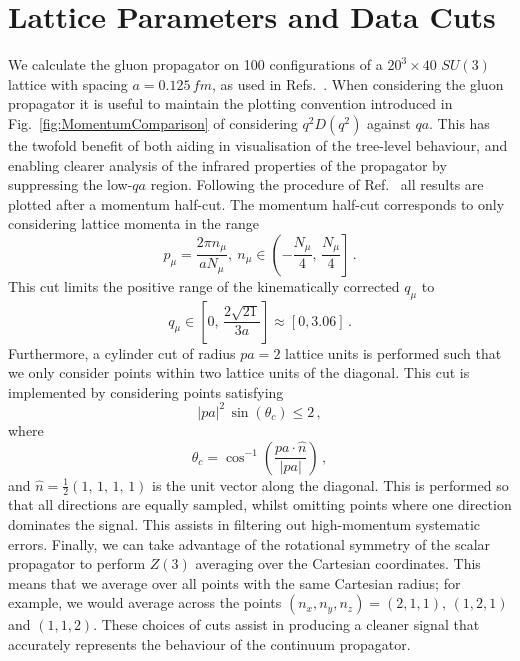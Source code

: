 \section{Lattice Parameters and Data Cuts} \label{sec:LatticeParameters}
We calculate the gluon propagator on 100 configurations of a $20^3\times 40$ $SU(3)$ lattice with spacing $a=0.125\,\si{fm}$, as used in Refs.~\cite{Trewartha:2015nna,OMalley:2011aa}. When considering the gluon propagator it is useful to maintain the plotting convention introduced in Fig.~\ref{fig:MomentumComparison} of considering $q^2D(q^2)$ against $qa$. This has the twofold benefit of both aiding in visualisation of the tree-level behaviour, and enabling clearer analysis of the infrared properties of the propagator by suppressing the low-$qa$ region. Following the procedure of Ref.~\cite{Bonnet:2001uh,Leinweber:1998im} all results are plotted after a momentum half-cut. The momentum half-cut corresponds to only considering lattice momenta in the range
%
\begin{equation}
p_\mu = \frac{2\pi n_\mu}{a N_\mu},~n_\mu\in \left(-\frac{N_\mu}{4},\,\frac{N_\mu}{4}\right]\, .
\end{equation}
%
This cut limits the positive range of the kinematically corrected $q_\mu$ to
%
\begin{equation}
q_\mu \in \left[0,\, \frac{2\sqrt{21}}{3a}\right]\approx\left[0,3.06\right]\, .
\end{equation}
%
Furthermore, a cylinder cut of radius $pa=2$ lattice units is performed such that we only consider points within two lattice units of the diagonal. This cut is implemented by considering points satisfying
%
\begin{equation}
|pa|^2\, \sin(\theta_c) \leq 2\, ,
\end{equation}
%
where
%
\begin{equation}
\theta_c = \cos^{-1}\left(\frac{pa \cdot \hat{n}}{|pa|}\right)\, ,
\end{equation}
%
and $\hat{n} = \frac{1}{2}(1,\,1,\,1,\,1)$ is the unit vector along the diagonal. This is performed so that all directions are equally sampled, whilst omitting points where one direction dominates the signal. This assists in filtering out high-momentum systematic errors. Finally, we can take advantage of the rotational symmetry of the scalar propagator to perform $Z(3)$ averaging over the Cartesian coordinates. This means that we average over all points with the same Cartesian radius; for example, we would average across the points $(n_x,n_y,n_z)=(2,1,1),\,(1,2,1)$ and $(1,1,2)$. These choices of cuts assist in producing a cleaner signal that accurately represents the behaviour of the continuum propagator.\\

